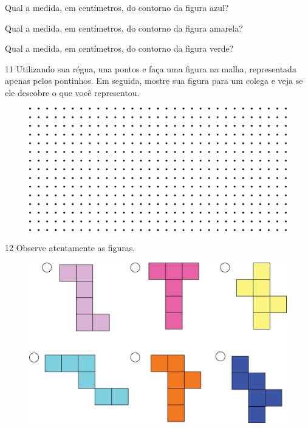 \begin{escolha}
\item Qual a medida, em centímetros, do contorno da figura azul?

\reduline{18 cm\hfill}

\item Qual a medida, em centímetros, do contorno da figura amarela?

\reduline{12 cm\hfill}

\item Qual a medida, em centímetros, do contorno da figura verde?

\reduline{22 cm\hfill}
\end{escolha}

\pagebreak
\num{11} Utilizando sua régua, una pontos e faça uma figura na malha, representada apenas pelos pontinhos. Em seguida, mostre sua
figura para um colega e veja se ele descobre o que você representou.

\begin{figure}[htpb!]
\includegraphics[width=\textwidth]{./media/image58.png}
\end{figure}


\num{12} Observe atentamente as figuras.

\begin{figure}[htpb!]
\centering
\includegraphics[width=.6\textwidth]{./media/image59.png}
\end{figure}

